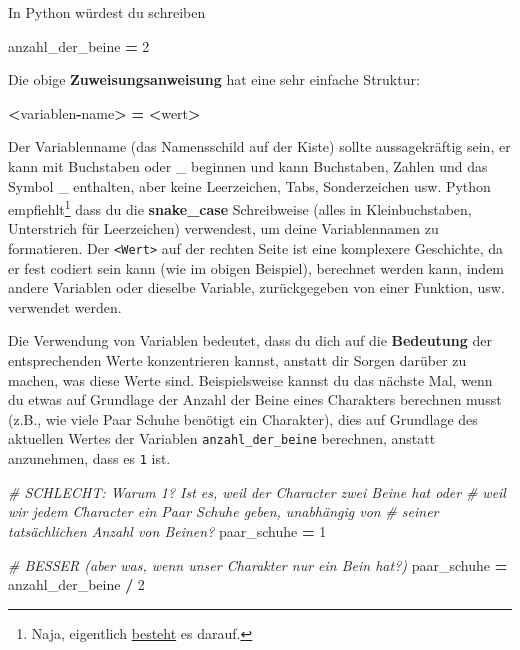 \documentclass[
]{book}
\newenvironment{Shaded}{\begin{snugshade}}{\end{snugshade}}
\newcommand{\CommentTok}[1]{\textcolor[rgb]{0.56,0.35,0.01}{\textit{#1}}}
\newcommand{\DecValTok}[1]{\textcolor[rgb]{0.00,0.00,0.81}{#1}}
\newcommand{\NormalTok}[1]{#1}
\newcommand{\OperatorTok}[1]{\textcolor[rgb]{0.81,0.36,0.00}{\textbf{#1}}}
\begin{document}
In Python würdest du schreiben

\begin{Shaded}
\begin{Highlighting}[]
\NormalTok{anzahl\_der\_beine }\OperatorTok{=} \DecValTok{2}
\end{Highlighting}
\end{Shaded}

Die obige \textbf{Zuweisungsanweisung} hat eine sehr einfache Struktur:

\begin{Shaded}
\begin{Highlighting}[]
\OperatorTok{\textless{}}\NormalTok{variablen}\OperatorTok{{-}}\NormalTok{name}\OperatorTok{\textgreater{}} \OperatorTok{=} \OperatorTok{\textless{}}\NormalTok{wert}\OperatorTok{\textgreater{}}
\end{Highlighting}
\end{Shaded}

Der Variablenname (das Namensschild auf der Kiste) sollte aussagekräftig sein, er kann mit Buchstaben oder \_ beginnen und kann Buchstaben, Zahlen und das Symbol \_ enthalten, aber keine Leerzeichen, Tabs, Sonderzeichen usw. Python empfiehlt\footnote{Naja, eigentlich \href{https://www.python.org/dev/peps/pep-0008/}{besteht} es darauf.} dass du die \textbf{snake\_case} Schreibweise (alles in Kleinbuchstaben, Unterstrich für Leerzeichen) verwendest, um deine Variablennamen zu formatieren. Der \texttt{\textless{}Wert\textgreater{}} auf der rechten Seite ist eine komplexere Geschichte, da er fest codiert sein kann (wie im obigen Beispiel), berechnet werden kann, indem andere Variablen oder dieselbe Variable, zurückgegeben von einer Funktion, usw. verwendet werden.

Die Verwendung von Variablen bedeutet, dass du dich auf die \textbf{Bedeutung} der entsprechenden Werte konzentrieren kannst, anstatt dir Sorgen darüber zu machen, was diese Werte sind. Beispielsweise kannst du das nächste Mal, wenn du etwas auf Grundlage der Anzahl der Beine eines Charakters berechnen musst (z.B., wie viele Paar Schuhe benötigt ein Charakter), dies auf Grundlage des aktuellen Wertes der Variablen \texttt{anzahl\_der\_beine} berechnen, anstatt anzunehmen, dass es \texttt{1} ist.

\begin{Shaded}
\begin{Highlighting}[]
\CommentTok{\# SCHLECHT: Warum 1? Ist es, weil der Character zwei Beine hat oder}
\CommentTok{\# weil wir jedem Character ein Paar Schuhe geben, unabhängig von}
\CommentTok{\# seiner tatsächlichen Anzahl von Beinen?}
\NormalTok{paar\_schuhe }\OperatorTok{=} \DecValTok{1}

\CommentTok{\# BESSER (aber was, wenn unser Charakter nur ein Bein hat?)}
\NormalTok{paar\_schuhe }\OperatorTok{=}\NormalTok{ anzahl\_der\_beine }\OperatorTok{/} \DecValTok{2}
\end{Highlighting}
\end{Shaded}
\end{document}
